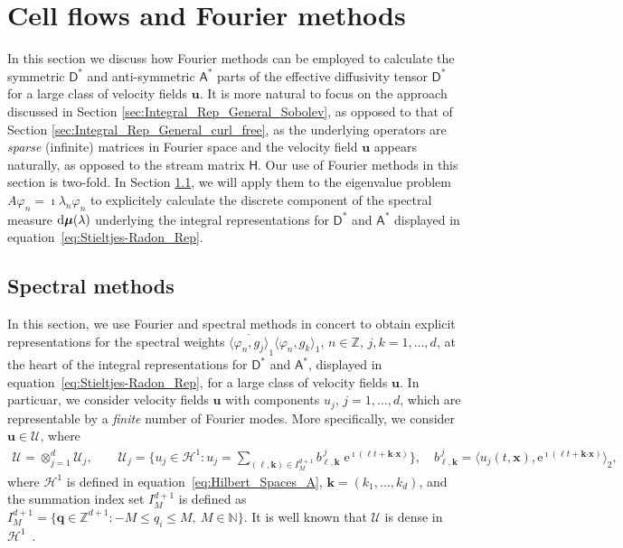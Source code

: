 \documentclass[leqno,onefignum,onetabnum]{siamltex1213}
\newcommand{\e}{\mathrm{e}}
\renewcommand{\d}{\mathrm{d}}
\newcommand{\Uc}{\mathcal{U}}
\newcommand{\Dm}{\mathsf{D}}
\newcommand{\Hm}{\mathsf{H}}
\newcommand{\Am}{\mathsf{A}}
\newcommand{\Hs}{\mathscr{H}}
\newcommand\bmu{\mbox{\boldmath${\mu}$}}
\providecommand\bcdot{\boldsymbol{\cdot}}
\newcommand{\vecx}{\boldsymbol{x}}
\newcommand{\vecu}{\boldsymbol{u}}
\newcommand{\veck}{\boldsymbol{k}}
\newcommand{\vecq}{\boldsymbol{q}}
\begin{document}
\section{Cell flows and Fourier methods}\label{sec:Fourier_Methods}
%
In this section we discuss how Fourier methods can be employed to
calculate the symmetric $\Dm^*$ and anti-symmetric $\Am^*$
parts of the effective diffusivity tensor $\Dm^*$ for a large class
of velocity fields $\vecu $. It is more natural  to focus on the
approach discussed in Section \ref{sec:Integral_Rep_General_Sobolev},
as opposed to that of Section
\ref{sec:Integral_Rep_General_curl_free}, as the underlying operators
are \emph{sparse} (infinite) matrices in Fourier space and the 
velocity field $\vecu $ appears naturally, as opposed to the stream
matrix $\Hm$. Our use of Fourier methods in this section is
two-fold. In Section \ref{sec:Spectral_Fourier_Methods}, we will apply
them to the eigenvalue problem $A\varphi_n=\imath\lambda_n\varphi_n$
to explicitely calculate the discrete component of the spectral
measure $\d\bmu(\lambda)$ underlying the integral representations for
$\Dm^*$ and $\Am^*$ displayed in
equation~\eqref{eq:Stieltjes-Radon_Rep}.  




%
\subsection{Spectral methods}
\label{sec:Spectral_Fourier_Methods}
%
In this section, we use Fourier and spectral methods in concert to
obtain explicit representations for the spectral weights
$\overline{\langle\varphi_n,g_j\rangle}_1\langle\varphi_n,g_k\rangle_1$, $n\in\mathbb{Z}$, $j,k=1,\ldots,d$, at
the heart of the integral representations for $\Dm^*$ and
$\Am^*$, displayed in equation~\eqref{eq:Stieltjes-Radon_Rep}, for
a large class of velocity fields $\vecu $. In particuar, we consider
velocity fields $\vecu $ with components $u_j$, $j=1,\ldots,d$, which are
representable by a \emph{finite} number of Fourier modes. More
specifically, we consider $\vecu \in\Uc$, where 
%
\begin{align}\label{eq:velocity_field_space}
  \Uc=\otimes_{j=1}^d\Uc_j, \qquad
  \Uc_j=\Big\{u_j\in\Hs^1:u_j=\sum_{(\ell,\veck)\in I_M^{d+1}}b^{\,j}_{\ell,\veck}\;\e^{\imath(\ell t+\veck\bcdot\vecx)}\Big\},
   \quad
  b^{\,j}_{\ell,\veck}=\big\langle u_j(t,\vecx),\e^{\imath(\ell t+\veck\bcdot\vecx)}\big\rangle_2, 
\end{align}
%
where $\Hs^1$ is defined in equation~\eqref{eq:Hilbert_Spaces_A},
$\veck=(k_1,\ldots,k_d)$, and the summation index set $I_M^{d+1}$ is defined as
$I_M^{d+1}=\{\vecq\in\mathbb{Z}^{d+1}:-M\leq q_i\leq M, \ M\in\mathbb{N}\}$. It is well
known that $\Uc$ is dense in $\Hs^1$~\cite{Folland:99}. 
\end{document}

